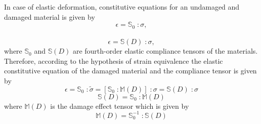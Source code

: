 \documentclass[a4paper,12pt,twoside]{report}
\begin{document}
In case of elastic deformation, constitutive equations for an undamaged and damaged material is given by
\begin{equation}
\epsilon = \mathbb{S}_{0}\; : \sigma,
\end{equation}\\
\begin{equation}
\epsilon = \mathbb{S}(D)\; : \sigma,
\end{equation}
where $\mathbb{S}_{0}$ and $\mathbb{S}(D)$  are fourth-order elastic compliance tensors of the materials. Therefore, according to the hypothesis of strain equivalence the elastic constitutive equation of the damaged material and the compliance tensor is given by 
\begin{equation}
\epsilon = \mathbb{S}_{0}\; : \tilde{\sigma}  =  [\mathbb{S}_{0}\;: \mathbb{M} (D)]\;: \sigma = \mathbb{S}(D)\; : \sigma
\end{equation}
\begin{equation}
\mathbb{S}(D) = \mathbb{S}_{0}\; : \mathbb{M} (D)
 \label{eqn:S_HSeq}
\end{equation}
where $\mathbb{M} (D)$ is the damage effect tensor which is given by 
\begin{equation}
\mathbb{M} (D)  = \mathbb{S}_{0}^{-1} \; : \mathbb{S}(D) 
\end{equation}
\end{document}
